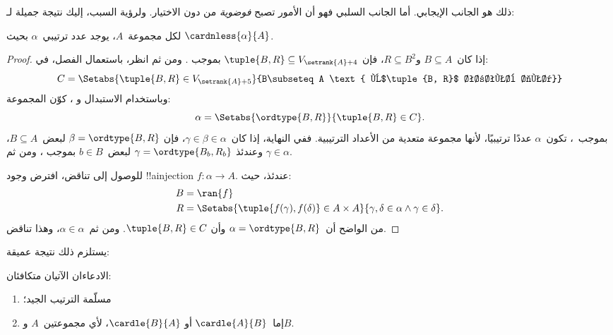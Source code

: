 \documentclass[../../../include/open-logic-section]{subfiles}
\begin{document}

ذلك هو الجانب الإيجابي. أما الجانب السلبي فهو أن الأمور تصبح
\emph{فوضوية} من دون الاختيار. ولرؤية السبب، إليك نتيجة جميلة
لـ\cite{Hartogs1915}:

\begin{lem}[\emph{في $\ZF$}]
لكل مجموعة~$A$، يوجد عدد ترتيبي~$\alpha$ بحيث
$\cardnless{\alpha}{A}$.
\end{lem}

\begin{proof}
إذا كان~$B \subseteq A$ و$R \subseteq B^2$، فإن
$\tuple{B, R} \subseteq V_{\setrank{A}+4}$ بموجب
. ومن ثم انظر،
باستعمال الفصل، في:
\[
	C = \Setabs{\tuple{B, R} \in V_{\setrank{A}+5}}{B\subseteq A
	\text{ و$\tuple{B, R}$ ترتيب جيد}}
\]
وباستخدام الاستبدال و
، كوّن المجموعة:
\[
	\alpha = \Setabs{\ordtype{B, R}}{\tuple{B, R} \in C}.
\]
بموجب~، تكون~$\alpha$
عددًا ترتيبيًا، لأنها مجموعة متعدية من الأعداد الترتيبية. ففي
النهاية، إذا كان~$\gamma \in \beta \in \alpha$، فإن
$\beta = \ordtype{B, R}$ لبعض~$B \subseteq A$، وعندئذ
$\gamma = \ordtype{B_b, R_b}$ لبعض~$b \in B$ بموجب
، ومن ثم
$\gamma \in \alpha$.

للوصول إلى تناقض، افترض وجود !!a{injection}
$f \colon \alpha \to A$. عندئذ، حيث:
\begin{align*}
	B &= \ran{f}\\
	R &= \Setabs{\tuple{f(\gamma), f(\delta)} \in A \times A}
	  {\gamma,\delta \in \alpha \land \gamma \in \delta}.
\end{align*}
من الواضح أن~$\alpha = \ordtype{B, R}$ وأن
$\tuple{B, R} \in C$. ومن ثم~$\alpha \in \alpha$، وهذا تناقض.
\end{proof}

يستلزم ذلك نتيجة عميقة:

\begin{thm}[\emph{في $\ZF$}]
الادعاءان الآتيان متكافئان:
\begin{enumerate}
	\item{} مسلّمة الترتيب الجيد؛
	\item{} إما~$\cardle{A}{B}$ أو
	$\cardle{B}{A}$، لأي مجموعتين~$A$ و$B$.
\end{enumerate}
\end{thm}
\end{document}
